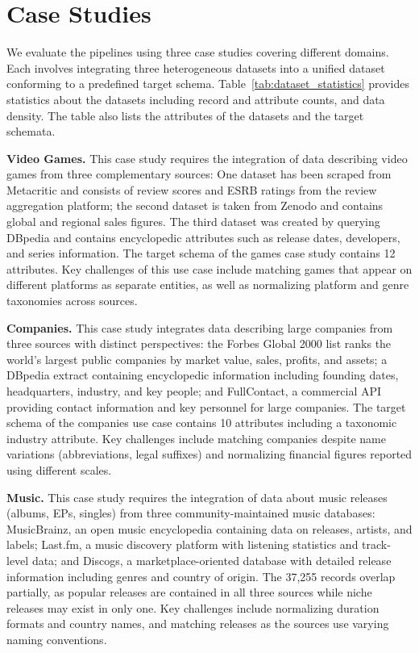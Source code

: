 \section{Case Studies}
\label{sec:case_studies}
We evaluate the pipelines using three case studies covering different domains. Each involves integrating three heterogeneous datasets into a unified dataset conforming to a predefined target schema. Table~\ref{tab:dataset_statistics} provides statistics about the datasets including record and attribute counts, and data density. The table also lists the attributes of the datasets and the target schemata.


\textbf{Video Games.} \label{sec:games_case}
This case study requires the integration of data describing video games from three complementary sources: One dataset has been scraped from Metacritic and consists of review scores and ESRB ratings from the review aggregation platform; the second dataset is taken from Zenodo and contains global and regional sales figures. The third dataset was created by querying DBpedia and contains encyclopedic attributes such as release dates, developers, and series information.  The target schema of the games case study contains 12 attributes. Key challenges of this use case include matching games that appear on different platforms as separate entities, as well as normalizing platform and genre taxonomies across sources.

\textbf{Companies.} \label{sec:companies_case}
This case study integrates data describing large companies from three sources with distinct perspectives: the Forbes Global 2000 list ranks the world's largest public companies by market value, sales, profits, and assets; a DBpedia extract containing encyclopedic information including founding dates, headquarters, industry, and key people; and FullContact, a commercial API providing contact information and key personnel for large companies. The target schema of the companies use case contains 10 attributes including a taxonomic industry attribute. Key challenges include matching companies despite name variations (abbreviations, legal suffixes) and normalizing financial figures reported using different scales.

\textbf{Music.} \label{sec:music_case}
This case study requires the integration of data about music releases (albums, EPs, singles) from three community-maintained music databases: MusicBrainz, an open music encyclopedia containing data on releases, artists, and labels; Last.fm, a music discovery platform with listening statistics and track-level data; and Discogs, a marketplace-oriented database with detailed release information including genres and country of origin. The 37,255 records overlap partially, as popular releases are contained in all three sources while niche releases may exist in only one. Key challenges include normalizing duration formats and country names, and matching releases as the sources use varying naming conventions.

